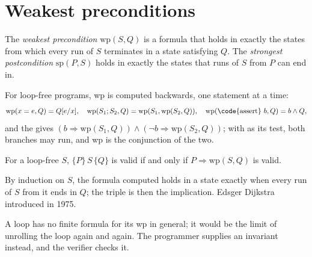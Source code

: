 \section{Weakest preconditions}\label{sec:b3:program-verification:wp}

\begin{definition}\label{def:b3:program-verification:wp}
The \emph{weakest precondition} $\mathrm{wp}(S, Q)$ is a formula that holds in exactly the states from which every run of $S$ terminates in a state satisfying $Q$. The \emph{strongest postcondition} $\mathrm{sp}(P, S)$ holds in exactly the states that runs of $S$ from $P$ can end in.
\end{definition}

For loop-free programs, wp is computed backwards, one statement at a time:
\[
\mathrm{wp}(x = e, Q) = Q[e/x], \quad \mathrm{wp}(S_1; S_2, Q) = \mathrm{wp}(S_1, \mathrm{wp}(S_2, Q)), \quad \mathrm{wp}(\text{\code{assert} } b, Q) = b \wedge Q,
\]
and the  gives $(b \Rightarrow \mathrm{wp}(S_1, Q)) \wedge (\neg b \Rightarrow \mathrm{wp}(S_2, Q))$; with  as its test, both branches may run, and wp is the conjunction of the two.

\begin{theorem}\label{thm:b3:program-verification:wp}
For a loop-free $S$, $\{P\}\,S\,\{Q\}$ is valid if and only if $P \Rightarrow \mathrm{wp}(S, Q)$ is valid.
\end{theorem}

By induction on $S$, the formula computed holds in a state exactly when every run of $S$ from it ends in $Q$; the triple is then the implication. Edsger Dijkstra introduced  in 1975. %

\label{lst:b3:program-verification:wp}

\label{out:b3:program-verification:wp}

A loop has no finite formula for its wp in general; it would be the limit of unrolling the loop again and again. The programmer supplies an invariant instead, and the verifier checks it.


